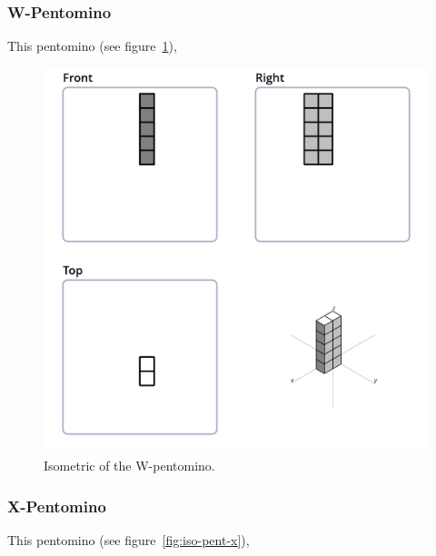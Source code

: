 \subsubsection{W-Pentomino}
This pentomino (see figure~\ref{fig:iso-pent-w}),


\begin{figure}
	\centering
	\includegraphics[scale=0.3]{iso_diagrams/o.png}
	\caption{Isometric of the W-pentomino.}
  \label{fig:iso-pent-w}
\end{figure}
\subsubsection{X-Pentomino}
This pentomino (see figure~\ref{fig:iso-pent-x}),


